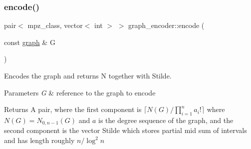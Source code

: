\subsubsection{\texorpdfstring{encode()}{encode()}}
{\footnotesize\ttfamily pair$<$ mpz\+\_\+class, vector$<$ int $>$ $>$ graph\+\_\+encoder\+::encode (\begin{DoxyParamCaption}\item[{const \hyperlink{classgraph}{graph} \&}]{G }\end{DoxyParamCaption})}



Encodes the graph and returns N together with Stilde. 


\begin{DoxyParams}{Parameters}
{\em G} & reference to the graph to encode \\
\hline
\end{DoxyParams}
\begin{DoxyReturn}{Returns}
A pair, where the first component is $\lceil N(G) / \prod_{i=1}^n a_i! \rceil$ where $N(G) = N_{0,n-1}(G)$ and $a$ is the degree sequence of the graph, and the second component is the vector Stilde which stores partial mid sum of intervals and has length roughly $n / \log^2 n$ 
\end{DoxyReturn}


